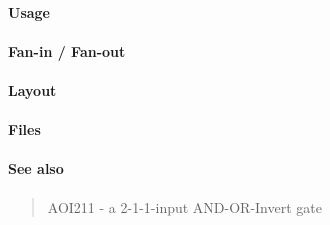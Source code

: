 \paragraph{Usage}

\paragraph{Fan-in / Fan-out}

\paragraph{Layout}

\paragraph{Files}

\paragraph{See also}
\begin{quote}
    AOI211 - a 2-1-1-input AND-OR-Invert gate
\end{quote}
